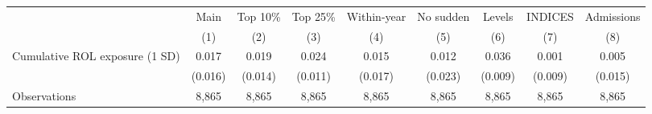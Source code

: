 \begin{tabular}{l*{8}{c}}
\toprule
 & Main & Top 10\% & Top 25\% & Within-year & No sudden & Levels & INDICES & Admissions \\
 & (1) & (2) & (3) & (4) & (5) & (6) & (7) & (8) \\
\midrule
Cumulative ROL exposure (1 SD)&       0.017         &       0.019         &       0.024\sym{**} &       0.015         &       0.012         &       0.036\sym{***}&       0.001         &       0.005         \\
            &     (0.016)         &     (0.014)         &     (0.011)         &     (0.017)         &     (0.023)         &     (0.009)         &     (0.009)         &     (0.015)         \\
\midrule
Observations&       8,865         &       8,865         &       8,865         &       8,865         &       8,865         &       8,865         &       8,865         &       8,865         \\
\bottomrule
\end{tabular}
